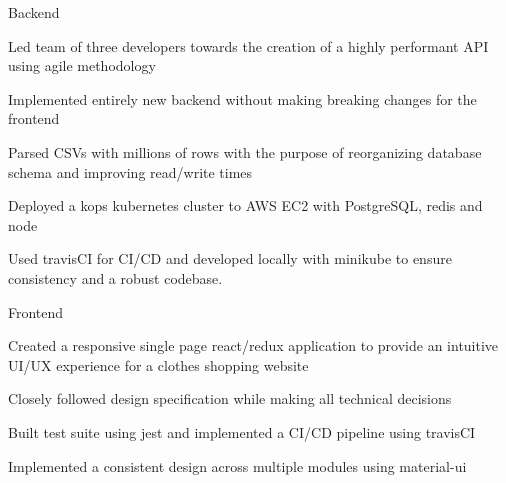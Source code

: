 
\begin{cventries}
  \cventry
    {} %
    {Backend} %
    {} %
    {} %
    {
      \begin{cvitems} %
        \item {Led team of three developers towards the creation of a highly performant API using agile methodology}
        \item {Implemented entirely new backend without making breaking changes for the frontend}
		\item {Parsed CSVs with millions of rows with the purpose of reorganizing database schema and improving read/write times}
		\item {Deployed a kops kubernetes cluster to AWS EC2 with PostgreSQL, redis and node}
		\item {Used travisCI for CI/CD and developed locally with minikube to ensure consistency and a robust codebase.}
      \end{cvitems}
    }
  
  \cventry
    {} %
    {Frontend} %
    {} %
    {} %
    {
      \begin{cvitems} %
		\item {Created a responsive single page react/redux application to provide an intuitive UI/UX experience for a clothes shopping website}
		\item {Closely followed design specification while making all technical decisions}
		\item {Built test suite using jest and implemented a CI/CD pipeline using travisCI}
		\item {Implemented a consistent design across multiple modules using material-ui}
      \end{cvitems}
    }

    

\end{cventries}
